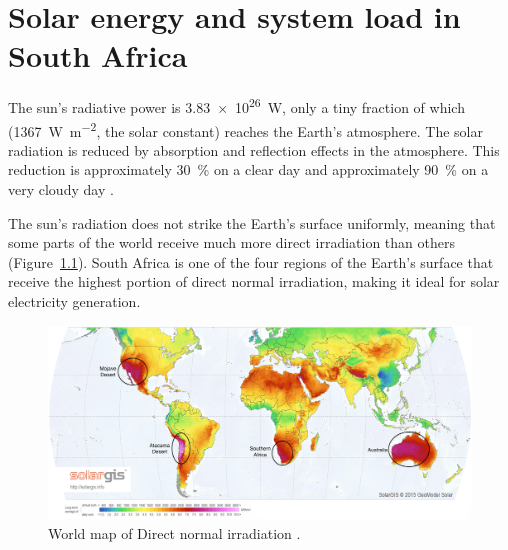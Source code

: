 \chapter{Solar energy and system load in South Africa}\label{Solar power in South Africa}


The sun's radiative power is \SI{3.83e26}{\watt}, only a tiny fraction of which (\SI{1367}{\watt\per\square\metre}, the solar constant) reaches the Earth's atmosphere. The solar radiation is reduced by absorption and reflection effects in the atmosphere.  This reduction is approximately \SI{30}{\percent} on a clear day and approximately \SI{90}{\percent} on a very cloudy day \cite{Stine2001a}.

The sun's radiation does not strike the Earth's surface uniformly, meaning that some parts of the world receive much more direct irradiation than others (Figure~\ref{WorldDNI}). South Africa is one of the four regions of the Earth's surface that receive the highest portion of direct normal irradiation, making it ideal for solar electricity generation.

\begin{figure}[h!] 
\centering
\includegraphics[width=1\linewidth]{FIG/WorldDNI}
\caption[World map of Direct normal irradiation.]{World map of Direct normal irradiation \cite{SolarGIS2015c}.}\label{WorldDNI}
\end{figure}  
\pagebreak
